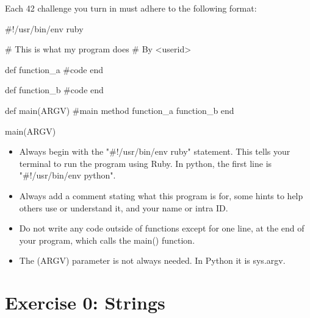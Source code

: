 \documentclass{42-en}
\begin{document}
Each 42 challenge you turn in must adhere to the following format:

\begin{42rbcode}
#!/usr/bin/env ruby

# This is what my program does
# By <userid>

def function_a
 #code
end

def function_b
 #code
end

def main(ARGV)
 #main method
 function_a
 function_b
end

main(ARGV)
\end{42rbcode}

\begin{itemize}
	\item Always begin with the "\#!/usr/bin/env ruby" statement. This tells your terminal to run the program using Ruby. In python, the first line is "\#!/usr/bin/env python".
	\item Always add a comment stating what this program is for, some hints to help others use or understand it, and your name or intra ID.
	\item Do not write any code outside of functions except for one line, at the end of your program, which calls the main() function.
	\item The (ARGV) parameter is not always needed. In Python it is sys.argv.
\end{itemize}


\startexercices



\chapter{Exercise 0: Strings}

\makeheaderfiles
\end{document}
